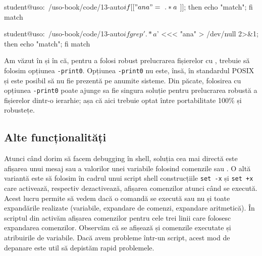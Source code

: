\begin{screen}[caption={Alternativă la folosirea {[[} (grep)},label={lst:auto:grep-vs-if-brackets}]
student@uso:~/uso-book/code/13-auto$ if [[ "ana" =~ .*a$ ]]; then echo "match"; fi
match

student@uso:~/uso-book/code/13-auto$ if grep '.*a$' <<< "ana" > /dev/null 2>&1; then echo "match"; fi
match
\end{screen}

Am văzut în  și în  că, pentru a folosi robust prelucrarea fișierelor cu , trebuie să folosim opțiunea \texttt{-print0}.
Opțiunea \texttt{-print0} nu este, însă, în standardul POSIX și este posibil să nu fie prezentă pe anumite sisteme.
Din păcate, folosirea  cu opțiunea \texttt{-print0} poate ajunge sa fie singura soluție pentru prelucrarea robustă a fișierelor dintr-o ierarhie; așa că aici trebuie optat între portabilitate 100\% și robustețe.

\subsection{Alte funcționalități}
\label{sec:auto:script-advanced:other}

Atunci când dorim să facem debugging în shell, soluția cea mai directă este afișarea unui mesaj sau a valorilor unei variabile folosind comenzile  sau .
O altă variantă este să folosim în cadrul unui script shell construcțiile \texttt{set -x} și \texttt{set +x} care activează, respectiv dezactivează, afișarea comenzilor atunci când se execută.
Acest lucru permite să vedem dacă o comandă se execută sau nu și toate expandările realizate (variabile, expandare de comenzi, expandare aritmetică).
În scriptul  din  activăm afișarea comenzilor pentru cele trei linii care folosesc expandarea comenzilor.
Observăm că se afișează și comenzile executate și atribuirile de variabile.
Dacă avem probleme într-un script, acest mod de depanare este util să depistăm rapid problemele.


